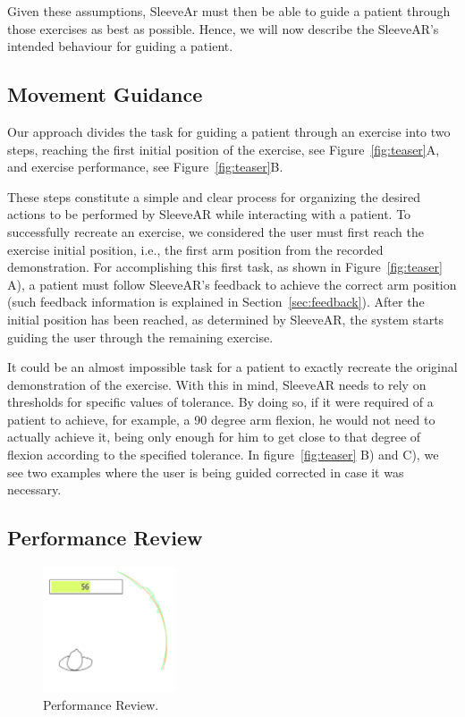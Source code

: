 Given these assumptions, SleeveAr must then be able to guide a patient through those exercises as best as possible. Hence, we will now describe the SleeveAR's intended behaviour for guiding a patient.


\subsection{Movement Guidance}
Our approach divides the task for guiding a patient through
an exercise into two steps, reaching the first
initial position of  the  exercise, see  Figure~\ref{fig:teaser}A,  and exercise performance, see  Figure~\ref{fig:teaser}B. 

These steps constitute a simple and clear process for organizing the desired actions to be performed by SleeveAR while interacting with a patient.
To successfully recreate an exercise, we considered the user must first reach the exercise initial position, i.e., the first arm position from the recorded demonstration.
For accomplishing this first task, as shown in Figure~\ref{fig:teaser} A), a patient must follow SleeveAR's feedback to achieve the correct arm position (such feedback information is explained in Section~\ref{sec:feedback}).
After the initial position has been reached, as determined by SleeveAR, the system starts guiding the user through the remaining exercise.

It could be an almost impossible task for a patient to exactly recreate the original demonstration of the exercise. 
With this in mind, SleeveAR needs to rely on thresholds for specific values of tolerance. 
By doing so, if it were required of a patient to achieve, for example, a 90 degree arm flexion, he would not 
need to actually achieve it, being only enough for him to get close to that degree of flexion according to the specified tolerance.
In figure~\ref{fig:teaser} B) and C), we see two examples where the user is being guided corrected in case it was necessary.


\subsection{Performance Review}

\begin{figure}
    \begin{center}
        \includegraphics[width=0.35\textwidth]{imgs/approach/performancereview}
    \end{center}
    \caption{Performance Review.}
    \label{fig:performancereview}
\end{figure}

